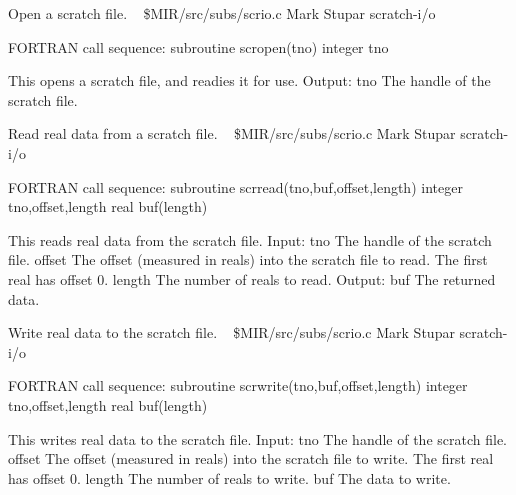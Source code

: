 \noindent Open a scratch file.
\newline \ 
\newline {} \$MIR/src/subs/scrio.c
\newline {} Mark Stupar
\newline {} scratch-i/o
\par{\tenpoint
{\eightpoint\begintt
FORTRAN call sequence:
        subroutine scropen(tno)
        integer tno

  This opens a scratch file, and readies it for use.
  Output:
    tno         The handle of the scratch file.                         
\endtt}
\par}
%
\noindent Read real data from a scratch file.
\newline \ 
\newline {} \$MIR/src/subs/scrio.c
\newline {} Mark Stupar
\newline \abox{Keywords:} scratch-i/o
\par{\tenpoint
{\eightpoint\begintt
FORTRAN call sequence:
        subroutine scrread(tno,buf,offset,length)
        integer tno,offset,length
        real buf(length)

  This reads real data from the scratch file.
  Input:
    tno         The handle of the scratch file.
    offset      The offset (measured in reals) into the scratch file
                to read. The first real has offset 0.
    length      The number of reals to read.
  Output:
    buf         The returned data.                                      
\endtt}
\par}
%
\noindent Write real data to the scratch file.
\newline \ 
\newline {} \$MIR/src/subs/scrio.c
\newline \abox{Responsible:} Mark Stupar
\newline {} scratch-i/o
\par{\tenpoint
{\eightpoint\begintt
FORTRAN call sequence:
        subroutine scrwrite(tno,buf,offset,length)
        integer tno,offset,length
        real buf(length)

  This writes real data to the scratch file.
  Input:
    tno         The handle of the scratch file.
    offset      The offset (measured in reals) into the scratch file
                to write. The first real has offset 0.
    length      The number of reals to write.
    buf         The data to write.                                      
\endtt}
\par}
